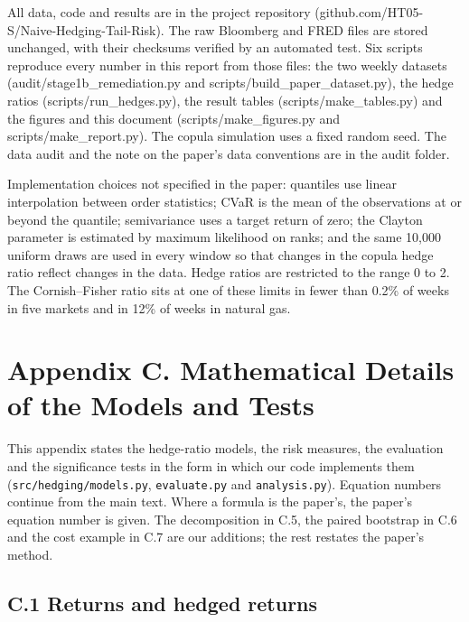 \documentclass[11pt,letterpaper]{article}
\begin{document}
{\small All data, code and results are in the project repository (github.com/HT05-S/Naive-Hedging-Tail-Risk). The raw Bloomberg and FRED files are stored unchanged, with their checksums verified by an automated test. Six scripts reproduce every number in this report from those files: the two weekly datasets (audit/stage1b\_remediation.py and scripts/build\_paper\_dataset.py), the hedge ratios (scripts/run\_hedges.py), the result tables (scripts/make\_tables.py) and the figures and this document (scripts/make\_figures.py and scripts/make\_report.py). The copula simulation uses a fixed random seed. The data audit and the note on the paper's data conventions are in the audit folder.\par}

{\small Implementation choices not specified in the paper: quantiles use linear interpolation between order statistics; CVaR is the mean of the observations at or beyond the quantile; semivariance uses a target return of zero; the Clayton parameter is estimated by maximum likelihood on ranks; and the same 10,000 uniform draws are used in every window so that changes in the copula hedge ratio reflect changes in the data. Hedge ratios are restricted to the range 0 to 2. The Cornish–Fisher ratio sits at one of these limits in fewer than 0.2\% of weeks in five markets and in 12\% of weeks in natural gas.\par}

\section*{Appendix C. Mathematical Details of the Models and Tests}

\begingroup\small
This appendix states the hedge-ratio models, the risk measures, the evaluation and the significance tests in the form in which our code implements them (\texttt{src/hedging/models.py}, \texttt{evaluate.py} and \texttt{analysis.py}). Equation numbers continue from the main text. Where a formula is the paper's, the paper's equation number is given. The decomposition in C.5, the paired bootstrap in C.6 and the cost example in C.7 are our additions; the rest restates the paper's method.

\subsection*{C.1 Returns and hedged returns}
\end{document}
